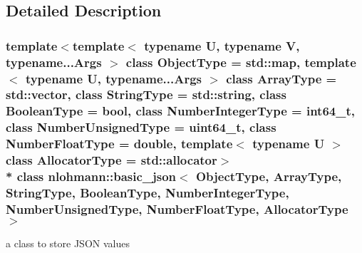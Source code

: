 \subsection{Detailed Description}
\subsubsection*{template$<$template$<$ typename U, typename V, typename...\+Args $>$ class Object\+Type = std\+::map, template$<$ typename U, typename...\+Args $>$ class Array\+Type = std\+::vector, class String\+Type = std\+::string, class Boolean\+Type = bool, class Number\+Integer\+Type = int64\+\_\+t, class Number\+Unsigned\+Type = uint64\+\_\+t, class Number\+Float\+Type = double, template$<$ typename U $>$ class Allocator\+Type = std\+::allocator$>$\\*
class nlohmann\+::basic\+\_\+json$<$ Object\+Type, Array\+Type, String\+Type, Boolean\+Type, Number\+Integer\+Type, Number\+Unsigned\+Type, Number\+Float\+Type, Allocator\+Type $>$}

a class to store J\+S\+ON values 


